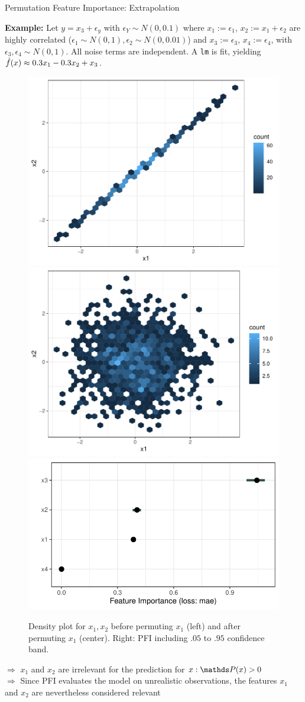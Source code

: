 \documentclass[11pt,compress,t,notes=noshow, xcolor=table]{beamer}
\begin{document}
\begin{vbframe}{Permutation Feature Importance: Extrapolation}
 
 \textbf{Example:} Let $y = x_3 + \epsilon_y$ with $\epsilon_Y \sim N(0, 0.1)$ where $x_1 :=  \epsilon_1$, $x_2 := x_1 + \epsilon_2$ are highly correlated ($\epsilon_1 \sim N(0,1), \epsilon_2 \sim N(0, 0.01)$) and $x_3 := \epsilon_3$, $x_4 := \epsilon_4$,  with $\epsilon_3, \epsilon_4 \sim N(0,1)$. All noise terms are independent.
A \texttt{lm} is fit, yielding $\fh(x) \approx 0.3 x_1 - 0.3 x_2 + x_3$.\\
\begin{figure}
\hfill
  \includegraphics[width=0.25\linewidth]{figure_man/pfi_hexbin_pre.pdf}\hfill
  \includegraphics[width=0.25\linewidth]{figure_man/pfi_hexbin_post.pdf} \hfill
  \includegraphics[width=0.4\linewidth]{figure_man/pfi_extrapolation.pdf} \hfill
  \caption{Density plot for $x_1, x_2$ before permuting $x_1$ (left) and after permuting $x_1$ (center). Right: PFI including $.05$ to $.95$ confidence band.}
\end{figure}
% 
$\Rightarrow$ $x_1$ and $x_2$ are irrelevant for the prediction for $x: \P(x) > 0$ \\
$\Rightarrow$ Since PFI evaluates the model on unrealistic observations, the features $x_1$ and $x_2$ are nevertheless considered relevant

 \end{vbframe}
\end{document}
